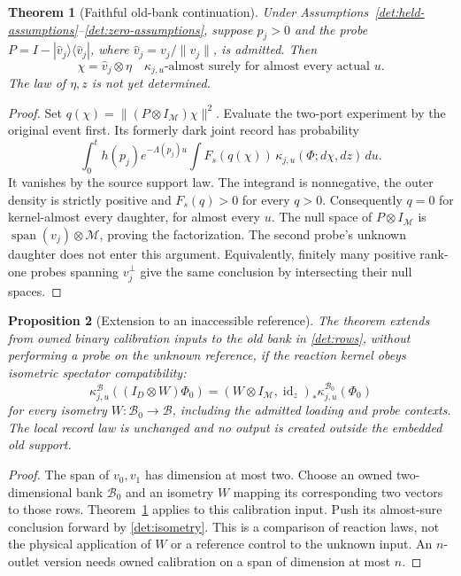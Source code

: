 \documentclass[11pt,oneside,openany]{book}
\newtheorem{theorem}{Theorem}[chapter]
\newtheorem{proposition}[theorem]{Proposition}
\theoremstyle{definition}
\theoremstyle{remark}\newtheorem{remark}[theorem]{Remark}
\begin{document}
\begin{theorem}[Faithful old-bank continuation]\label{det:dark-theorem}
Under Assumptions~\ref{det:held-assumptions}--\ref{det:zero-assumptions},
suppose $p_j>0$ and the probe
$P=I-|\widehat v_j\rangle\langle\widehat v_j|$, where
$\widehat v_j=v_j/\|v_j\|$, is admitted. Then
\begin{equation}
 \chi=\widehat v_j\otimes\eta
 \quad\kappa_{j,u}\text{-almost surely for almost every actual }u.
                                                        \label{det:faithful}
\end{equation}
The law of $\eta,z$ is not yet determined.
\end{theorem}
\begin{proof}
Set $q(\chi)=\|(P\otimes I_{\mathcal M})\chi\|^2$. Evaluate the
two-port experiment by the original event first. Its formerly dark
joint record has probability
\begin{equation}
 \int_0^t h(p_j)e^{-\Lambda(p_j)u}
 \int F_s(q(\chi))\,
       \kappa_{j,u}(\Phi;d\chi,dz)\,du.          \label{det:dark-integral}
\end{equation}
It vanishes by the source support law. The integrand is nonnegative,
the outer density is strictly positive and $F_s(q)>0$ for every $q>0$.
Consequently $q=0$ for kernel-almost every daughter, for almost every
$u$. The null space of $P\otimes I_{\mathcal M}$ is
$\operatorname{span}(v_j)\otimes\mathcal M$, proving the factorization.
The second probe's unknown daughter does not enter this argument.
Equivalently, finitely many positive rank-one probes spanning
$v_j^\perp$ give the same conclusion by intersecting their null spaces.
\end{proof}

\begin{proposition}[Extension to an inaccessible reference]
\label{det:spectator}
The theorem extends from owned binary calibration inputs to the old bank
in \eqref{det:rows}, without performing a probe on the unknown reference,
if the reaction kernel obeys isometric spectator compatibility:
\begin{equation}
 \kappa^{\mathcal B}_{j,u}((I_D\otimes W)\Phi_0)
  =(W\otimes I_{\mathcal M},\operatorname{id}_z)_*
       \kappa^{\mathcal B_0}_{j,u}(\Phi_0)         \label{det:isometry}
\end{equation}
for every isometry $W:\mathcal B_0\to\mathcal B$, including the
admitted loading and probe contexts. The local record law is unchanged
and no output is created outside the embedded old support.
\end{proposition}
\begin{proof}
The span of $v_0,v_1$ has dimension at most two. Choose an owned
two-dimensional bank $\mathcal B_0$ and an isometry $W$ mapping its
corresponding two vectors to those rows. Theorem~\ref{det:dark-theorem}
applies to this calibration input. Push its almost-sure conclusion
forward by \eqref{det:isometry}. This is a comparison of reaction laws,
not the physical application of $W$ or a reference control to the
unknown input. An $n$-outlet version needs owned calibration on a span
of dimension at most $n$.
\end{proof}
\end{document}
